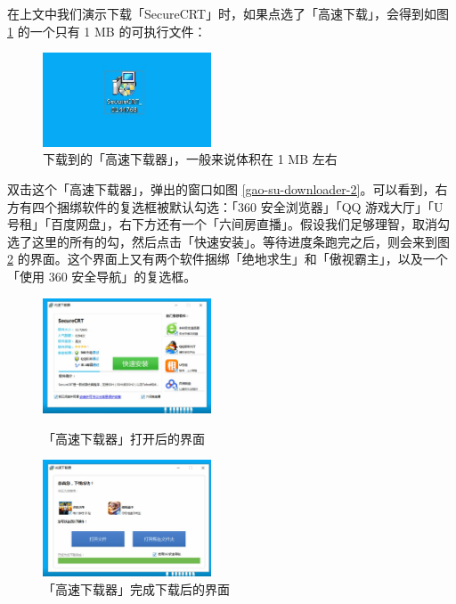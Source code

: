 在上文中我们演示下载「SecureCRT」时，如果点选了「高速下载」，会得到如图 \ref{gao-su-downloader-1} 的一个只有 1 MB 的可执行文件：

\begin{figure}[H]
  \centering
  \includegraphics[width=5cm]{assets/Gao_su_1.jpg}
  \caption{下载到的「高速下载器」，一般来说体积在 1 MB 左右}
  \label{gao-su-downloader-1}
\end{figure}

双击这个「高速下载器」，弹出的窗口如图 \ref{gao-su-downloader-2}。可以看到，右方有四个捆绑软件的复选框被默认勾选：「360 安全浏览器」「QQ 游戏大厅」「U 号租」「百度网盘」，右下方还有一个「六间房直播」。假设我们足够理智，取消勾选了这里的所有的勾，然后点击「快速安装」。等待进度条跑完之后，则会来到图 \ref{gao-su-downloader-3} 的界面。这个界面上又有两个软件捆绑「绝地求生」和「傲视霸主」，以及一个「使用 360 安全导航」的复选框。

\begin{figure}[htb!]
  \centering
  \begin{minipage}{6cm}
    \centering
    \includegraphics[width=5cm]{assets/Gao_su_2.jpg}
    \caption{「高速下载器」打开后的界面}
    \label{gao-su-downloader-2}
  \end{minipage}
  \qquad
  \begin{minipage}{6cm}
    \centering
    \includegraphics[width=5cm]{assets/Gao_su_3.jpg}
    \caption{「高速下载器」完成下载后的界面}
    \label{gao-su-downloader-3}
  \end{minipage} 
\end{figure}

